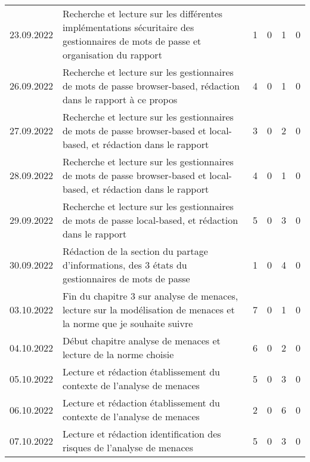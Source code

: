 \begin{landscape}
\begin{longtable}[c]{lp{10cm}rrrr}
	23.09.2022 
	& Recherche et lecture sur les différentes implémentations sécuritaire des gestionnaires de mots de passe et organisation du rapport
	& 1 %
	& 0 %
	& 1 %
	& 0\\ %

	26.09.2022  
	& Recherche et lecture sur les gestionnaires de mots de passe browser-based, rédaction dans le rapport à ce propos
	& 4 %
	& 0 %
	& 1 %
	& 0\\ %
	
	
	27.09.2022  
	& Recherche et lecture sur les gestionnaires de mots de passe browser-based et local-based, et rédaction dans le rapport
	& 3 %
	& 0 %
	& 2 %
	& 0\\ %
	
	28.09.2022  
	& Recherche et lecture sur les gestionnaires de mots de passe browser-based et local-based, et rédaction dans le rapport
	& 4 %
	& 0 %
	& 1 %
	& 0\\ %

	29.09.2022  
	& Recherche et lecture sur les gestionnaires de mots de passe local-based, et rédaction dans le rapport
	& 5 %
	& 0 %
	& 3 %
	& 0\\ %

	30.09.2022 
	& Rédaction de la section du partage d'informations, des 3 états du gestionnaires de mots de passe 
	& 1 %
	& 0 %
	& 4 %
	& 0\\ %

	03.10.2022 
	& Fin du chapitre 3 sur analyse de menaces, lecture sur la modélisation de menaces et la norme que je souhaite suivre
	& 7 %
	& 0 %
	& 1 %
	& 0\\ %

	04.10.2022
	& Début chapitre analyse de menaces et lecture de la norme choisie
	& 6 %
	& 0 %
	& 2 %
	& 0\\ %
	
	05.10.2022
	& Lecture et rédaction établissement du contexte de l'analyse de menaces
	& 5 %
	& 0 %
	& 3 %
	& 0\\ %

	06.10.2022 
	& Lecture et rédaction établissement du contexte de l'analyse de menaces
	& 2 %
	& 0 %
	& 6 %
	& 0\\ %

	07.10.2022 
	& Lecture et rédaction identification des risques de l'analyse de menaces
	& 5 %
	& 0 %
	& 3 %
	& 0\\ %


\end{longtable}
\end{landscape}
